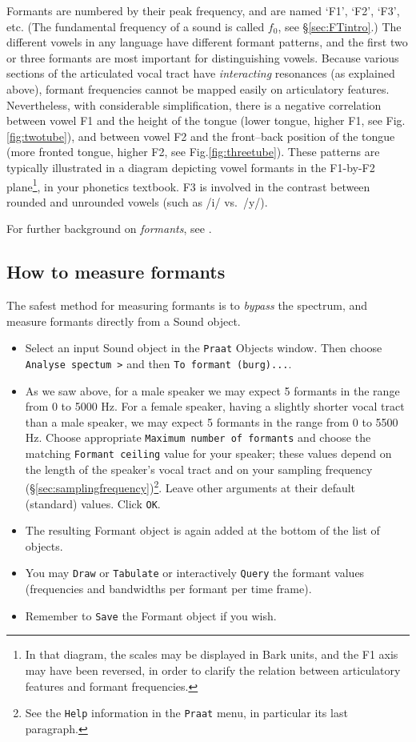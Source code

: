 \documentclass[
]{book}
\begin{document}
Formants are numbered by their peak frequency, and are named `F1', `F2', `F3', etc. (The fundamental frequency of a sound is called \(f_0\), see §\ref{sec:FTintro}.)
The different vowels in any language have different formant patterns, and the first two or three formants are most important for distinguishing vowels. Because various sections of the articulated vocal tract have \emph{interacting} resonances (as explained above), formant frequencies cannot be mapped easily on articulatory features. Nevertheless, with considerable simplification, there is a negative correlation between vowel F1 and the height of the tongue (lower tongue, higher F1, see Fig.\ref{fig:twotube}), and between vowel F2 and the front--back position of the tongue (more fronted tongue, higher F2, see Fig.\ref{fig:threetube}). These patterns are typically illustrated in a diagram depicting vowel formants in the F1-by-F2 plane\footnote{In that diagram, the scales may be displayed in Bark units, and the F1 axis may have been reversed, in order to clarify the relation between articulatory features and formant frequencies.}, in your phonetics textbook. F3 is involved in the contrast between rounded and unrounded vowels (such as /i/ vs.~/y/).

For further background on \emph{formants}, see \citet{Aalto_Malinen_Vainio_2018}.

\label{box-praatformants}
\subsection{How to measure formants}\label{sec:measureformants}

The safest method for measuring formants is to \emph{bypass} the spectrum, and measure formants directly from a Sound object.

\begin{itemize}
\item
  Select an input Sound object in the \texttt{Praat} Objects window. Then choose \texttt{Analyse\ spectum\ \textgreater{}} and then \texttt{To\ formant\ (burg)...}.
\item
  As we saw above, for a male speaker we may expect 5 formants in the range from 0 to 5000 Hz. For a female speaker, having a slightly shorter vocal tract than a male speaker, we may expect 5 formants in the range from 0 to 5500 Hz. Choose appropriate \texttt{Maximum\ number\ of\ formants} and choose the matching \texttt{Formant\ ceiling} value for your speaker; these values depend on the length of the speaker's vocal tract and on your sampling frequency (§\ref{sec:samplingfrequency})\footnote{See the \texttt{Help} information in the \texttt{Praat} menu, in particular its last paragraph.}.
  Leave other arguments at their default (standard) values. Click \texttt{OK}.
\item
  The resulting Formant object is again added at the bottom of the list of objects.
\item
  You may \texttt{Draw} or \texttt{Tabulate} or interactively \texttt{Query} the formant values (frequencies and bandwidths per formant per time frame).
\item
  Remember to \texttt{Save} the Formant object if you wish.
\end{itemize}
\end{document}
